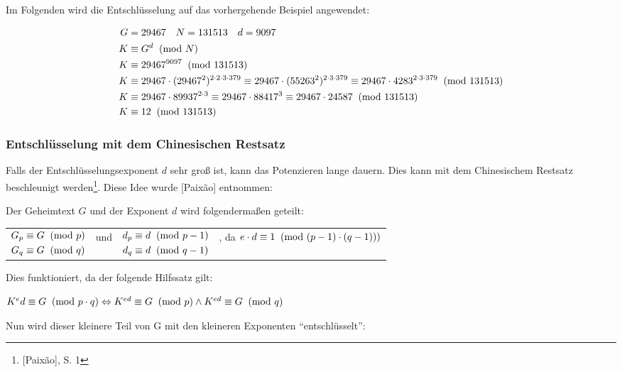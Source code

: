 Im Folgenden wird die Entschlüsselung auf das vorhergehende Beispiel
angewendet:

\begin{align*}
G &= 29467 ~~~ N= 131513 ~~~ d = 9097 \\
K &\equiv G^d \imod{N}\\
K &\equiv 29467^{9097} \imod{131513}\\
K &\equiv 29467 \cdot (29467^2)^{2 \cdot 2 \cdot 3 \cdot 379} \equiv 29467 \cdot (55263^2)^{2 \cdot 3 \cdot 379} \equiv 29467 \cdot 4283^{2 \cdot 3 \cdot 379} \imod{131513} \\
K &\equiv 29467 \cdot 89937^{2 \cdot 3} \equiv 29467 \cdot 88417^3 \equiv 29467 \cdot 24587 \imod{131513} \\
K &\equiv 12 \imod{131513}
\end{align*}

\subsubsection{Entschlüsselung mit dem Chinesischen Restsatz}
Falls der Entschlüsselungsexponent $d$ sehr groß ist, kann das
Potenzieren lange dauern. Dies kann mit dem Chinesischem Restsatz
beschleunigt werden\footnote{[Paixão], S. 1}.
Diese Idee wurde [Paixão] entnommen:

Der Geheimtext $G$ und der Exponent $d$ wird folgendermaßen geteilt:

\begin{tabular}{llll}
$\begin{aligned}
G_p &\equiv G \imod{p} \\
G_q &\equiv G \imod{q}
\end{aligned}$ & und &
$\begin{aligned}
d_p &\equiv d \imod{p-1} \\
d_q &\equiv d \imod{q-1}
\end{aligned}$ &, da $e \cdot d \equiv 1 \imod{(p-1) \cdot (q-1))}$
\end{tabular}

Dies funktioniert, da der folgende Hilfssatz gilt:

\begin{mdframed}[tikzsetting={draw=red,ultra thick}, innertopmargin=0.6cm]
$K^ed \equiv G \imod{p \cdot q} \Leftrightarrow K^{ed} \equiv G \imod{p} \land K^{ed} \equiv G \imod{q}$
\end{mdframed}

Nun wird dieser kleinere Teil von G mit den kleineren Exponenten "`entschlüsselt"':

